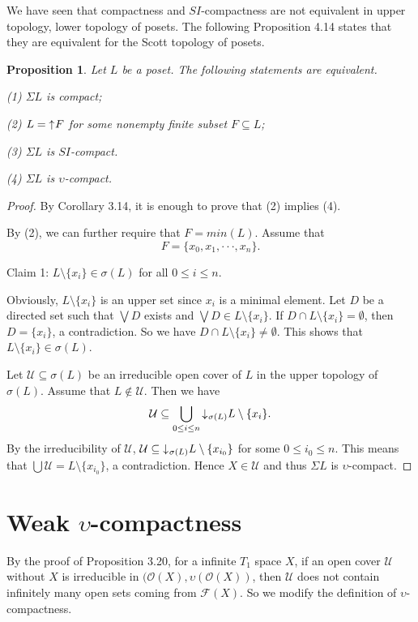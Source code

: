 \documentclass[preprint,12pt]{elsarticle}
\numberwithin{equation}{section}
\newtheorem{proposition}[theorem]{Proposition}
\newcommand{\dn}{\mathord{\downarrow}\hspace{0.05em}}
\newcommand{\up}{\mathord{\uparrow}\hspace{0.05em}}
\begin{document}
\quad We have seen that compactness and $SI$-compactness are not equivalent in upper topology, lower topology of posets. The following Proposition 4.14 states that they are equivalent for the Scott topology of posets.

\begin{proposition}Let $L$ be a poset. The following statements are equivalent.

{\rm(1)} $\Sigma L$ is compact;

{\rm(2)} $L=\up F$ for some nonempty finite subset $F\subseteq L$;

{\rm(3)} $\Sigma L$ is $SI$-compact.

{\rm(4)} $\Sigma L$ is $\upsilon$-compact.

\end{proposition}



\begin{proof}By Corollary 3.14, it is enough to prove that (2) implies (4).

By (2), we can further require that $F=min(L)$. Assume that $$F=\{x_{0},x_{1},\cdot\cdot\cdot,x_{n}\}.$$

Claim 1: $L\setminus \{x_{i}\}\in\sigma(L)$ for all $0\leq i\leq n$.

Obviously, $L\setminus \{x_{i}\}$ is an upper set since $x_{i}$ is a minimal element. Let $D$ be a directed set such that $\bigvee D$ exists and $\bigvee D\in L\setminus \{x_{i}\}$. If $D\cap L\setminus \{x_{i}\}=\emptyset$, then $D=\{x_{i}\}$, a contradiction. So we have $D\cap L\setminus \{x_{i}\}\neq\emptyset$. This shows that $L\setminus \{x_{i}\}\in\sigma(L)$.

Let $\mathcal{U}\subseteq\sigma(L)$ be an irreducible open cover of $L$ in the upper topology of $\sigma(L)$. Assume that $L\not\in\mathcal{U}$. Then we have
$$\mathcal{U}\subseteq\bigcup\limits_{0\leq i\leq n}\dn_{\sigma(L)} L\setminus\{x_{i}\} .$$
By the irreducibility of $\mathcal{U}$, $\mathcal{U}\subseteq \dn_{\sigma(L)} L\setminus\{x_{i_{0}}\}$ for some $0\leq i_{0}\leq n$. This means that $\bigcup\mathcal{U}=L\setminus\{x_{i_{0}}\}$, a contradiction. Hence $X\in\mathcal{U}$ and thus $\Sigma L$ is $\upsilon$-compact.
\end{proof}










\section{Weak $\upsilon$-compactness}
\quad By the proof of Proposition 3.20, for a infinite $T_{1}$ space $X$, if an open cover $\mathcal{U}$ without $X$ is irreducible in $(\mathcal{O}(X),\upsilon(\mathcal{O}(X))$, then $\mathcal{U}$ does not contain infinitely many open sets coming from $\mathscr{F}(X)$. So we modify the definition of $\upsilon$-compactness.
\end{document}
